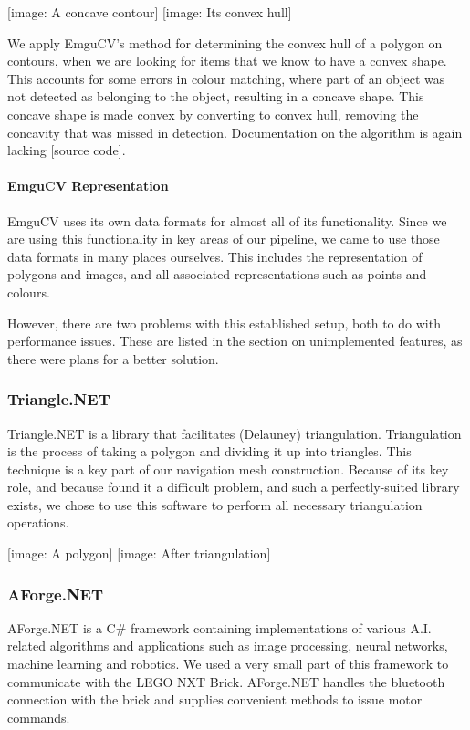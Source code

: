 \documentclass[10pt,twocolumn]{article}
\begin{document}
[image: A concave contour] [image: Its convex hull]

We apply EmguCV's method for determining the convex hull of a polygon on contours, when we are looking for items that we know to have a convex shape. This accounts for some errors in colour matching, where part of an object was not detected as belonging to the object, resulting in a concave shape. This concave shape is made convex by converting to convex hull, removing the concavity that was missed in detection. Documentation on the algorithm is again lacking [source code].

\paragraph{EmguCV Representation}
EmguCV uses its own data formats for almost all of its functionality. Since we are using this functionality in key areas of our pipeline, we came to use those data formats in many places ourselves. This includes the representation of polygons and images, and all associated representations such as points and colours.

However, there are two problems with this established setup, both to do with performance issues. These are listed in the section on unimplemented features, as there were plans for a better solution.

\subsubsection{Triangle.NET}
Triangle.NET is a library that facilitates (Delauney) triangulation. Triangulation is the process of taking a polygon and dividing it up into triangles. This technique is a key part of our navigation mesh construction. Because of its key role, and because found it a difficult problem, and such a perfectly-suited library exists, we chose to use this software to perform all necessary triangulation operations.

[image: A polygon] [image: After triangulation]

\subsubsection{AForge.NET}
AForge.NET is a C\# framework containing implementations of various A.I. related algorithms and applications such as image processing, neural networks, machine learning and robotics. We used a very small part of this framework to communicate with the LEGO NXT Brick. AForge.NET handles the bluetooth connection with the brick and supplies convenient methods to issue motor commands.
\end{document}
